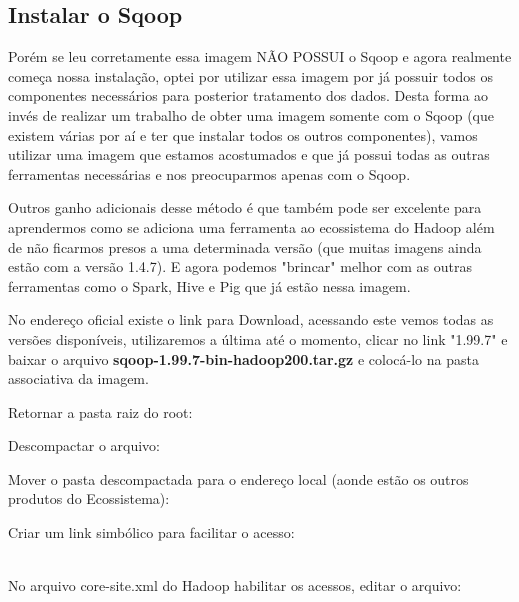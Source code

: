 \documentclass[a4paper,11pt]{article}
\begin{document}


\subsection{Instalar o Sqoop}
Porém se leu corretamente essa imagem NÃO POSSUI o Sqoop e agora realmente começa nossa instalação, optei por utilizar essa imagem por já possuir todos os componentes necessários para posterior tratamento dos dados. Desta forma ao invés de realizar um trabalho de obter uma imagem somente com o Sqoop (que existem várias por aí e ter que instalar todos os outros componentes), vamos utilizar uma imagem que estamos acostumados e que já possui todas as outras ferramentas necessárias e nos preocuparmos apenas com o Sqoop.

Outros ganho adicionais desse método é que também pode ser excelente para aprendermos como se adiciona uma ferramenta ao ecossistema do Hadoop além de não ficarmos presos a uma determinada versão (que muitas imagens ainda estão com a versão 1.4.7). E agora podemos "brincar" melhor com as outras ferramentas como o Spark, Hive e Pig que já estão nessa imagem.

No endereço oficial \cite{scoopoficial} existe o link para Download, acessando este vemos todas as versões disponíveis, utilizaremos a última até o momento, clicar no link "1.99.7" e baixar o arquivo \textbf{sqoop-1.99.7-bin-hadoop200.tar.gz} e colocá-lo na pasta associativa da imagem.

Retornar a pasta raiz do root: \\

Descompactar o arquivo: \\

Mover o pasta descompactada para o endereço local (aonde estão os outros produtos do Ecossistema): \\

Criar um link simbólico para facilitar o acesso: \\
 \\

No arquivo core-site.xml do Hadoop habilitar os acessos, editar o arquivo: \\
\end{document}
